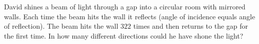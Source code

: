 David shines a beam of light through a gap into a circular room with mirrored walls. Each time the beam hits the wall it reflects (angle of incidence equals angle of reflection). The beam hits the wall $322$ times and then returns to the gap for the first time. In how many different directions could he have shone the light?
